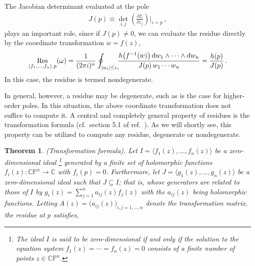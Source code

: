 \documentclass[dvipsnames,preprint,12pt,sort&compress]{elsarticle}
\newtheorem{theorem}{Theorem}
\def\d{{\rm d}}
\begin{document}
The Jacobian determinant evaluated at the pole
\begin{align}
J(p)\equiv \det_{i,j}\left(  \frac{\partial f_i}{\partial z_j}  \right)\bigg|_{z = p}\,,
\label{eq:Jacobian_determinant}
\end{align}
plays an important role, since if $J(p) \neq 0$, we can evaluate the
residue directly by the coordinate transformation $w = f(z)$,
\begin{align}
\mathop{\mathrm{Res}}_{\langle f_1,\dots,f_n \rangle,p}(\omega)
= \frac{1}{(2\pi i)^n}
\oint_{|w_i| \leq \epsilon_i} \hspace{-1.5mm}
\frac{h\big(f^{-1}(w)\big) \hspace{0.6mm} \d w_1\wedge\cdots\wedge \d w_n}{J(p) \hspace{0.6mm} w_1 \cdots w_n}
= \frac{h(p)}{J(p)} \,.
\label{eq:residue_from_Jacobian}
\end{align}
In this case, the residue is termed nondegenerate.

In general, however, a residue may be degenerate, such as is the
case for higher-order poles. In this situation, the above
coordinate transformation does not suffice to compute it.
A central and completely general property of residues
is the transformation formula (cf.~section 5.1 of ref.~\cite{GriffithsHarris}).
As we will shortly see, this property can be utilized to
compute any residue, degenerate or nondegenerate.

\begin{theorem}
(Transformation formula). Let $I = \langle f_1 (z), \ldots, f_n (z) \rangle$
be a zero-dimensional ideal%
\footnote{The ideal $I$ is said to be \emph{zero-dimensional}
if and only if the solution to the equation system $f_1 (z) = \cdots = f_n (z) = 0$
consists of a finite number of points $z \in \mathbb{CP}^n$.} generated
by a finite set of holomorphic functions $f_i (z) : \mathbb{CP}^n \to \mathbb{C}$
with $f_i (p) = 0$. Furthermore, let $J = \langle g_1 (z), \ldots, g_n (z) \rangle$
be a zero-dimensional ideal such that $J \subseteq I$; that is, whose generators
are related to those of $I$ by $g_i (z) = \sum_{j=1}^n a_{ij} (z) f_j(z)$
with the $a_{ij} (z)$ being holomorphic functions. Letting $A(z) = \big(a_{ij} (z) \big)_{i,j=1,\ldots,n}$
denote the transformation matrix, the residue at $p$ satisfies,
\end{theorem}

\vspace{-5mm}
\end{document}

